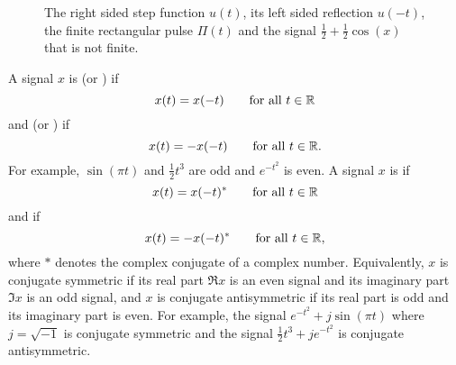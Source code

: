 \begin{figure}[tp]
\caption{The right sided step function $u(t)$, its left sided reflection $u(-t)$, the finite rectangular pulse $\Pi(t)$ and the signal $\tfrac{1}{2} + \tfrac{1}{2}\cos(x)$ that is not finite.  %
} 
\label{fig:stepsided}
\end{figure}

A signal $x$ is  (or ) if 
\[
x(t) = x(-t) \qquad \text{for all $t \in {\mathbb R}$}
\] 
and  (or ) if 
\[
x(t) = -x(-t) \qquad \text{for all $t \in {\mathbb R}$}.
\]  
For example, $\sin(\pi t)$ and $\tfrac{1}{2}t^3$ are odd and $e^{-t^2}$ is even.  %
A signal $x$ is  if 
\[
x(t) = x(-t)^* \qquad \text{for all $t \in {\mathbb R}$}
\]
and  if 
\[
x(t) = -x(-t)^* \qquad \text{for all $t \in {\mathbb R}$},
\]
where $*$ denotes the complex conjugate of a complex number.  Equivalently, $x$ is conjugate symmetric if its real part $\Re x$ is an even signal and its imaginary part $\Im x$ is an odd signal, and $x$ is conjugate antisymmetric if its real part is odd and its imaginary part is even.  For example, the signal $e^{-t^2} + j \sin(\pi t)$ where $j = \sqrt{-1}$ is conjugate symmetric and the signal $\tfrac{1}{2}t^{3} + j e^{-t^2}$ is conjugate antisymmetric.

